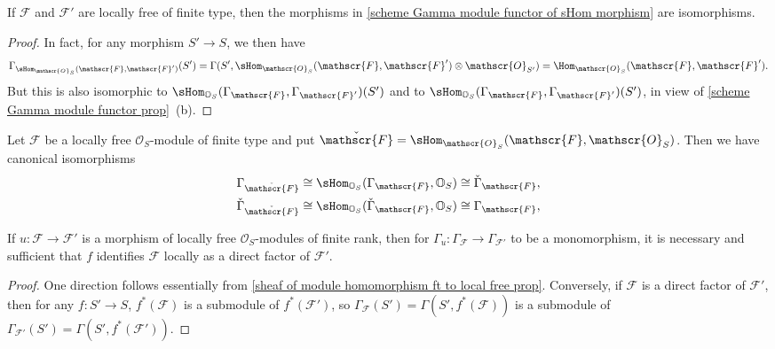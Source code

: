 \begin{proposition}\label{scheme Gamma module functor of sHom locally free prop}
If $\mathscr{F}$ and $\mathscr{F}'$ are locally free of finite type, then the morphisms in \cref{scheme Gamma module functor of sHom morphism} are isomorphisms.
\end{proposition}
\begin{proof}
In fact, for any morphism $S'\to S$, we then have
\[\Gamma_{\sHom_{\mathscr{O}_S}(\mathscr{F},\mathscr{F}')}(S')=\Gamma(S',\sHom_{\mathscr{O}_S}(\mathscr{F},\mathscr{F}')\otimes\mathscr{O}_{S'})=\Hom_{\mathscr{O}_S}(\mathscr{F},\mathscr{F}').\]
But this is also isomorphic to $\sHom_{\mathbb{O}_S}(\Gamma_\mathscr{F},\Gamma_{\mathscr{F}'})(S')$ and to $\sHom_{\mathbb{O}_S}(\Gamma_\mathscr{F},\Gamma_{\mathscr{F}'})(S')$, in view of \cref{scheme Gamma module functor prop}~(b).
\end{proof}

\begin{corollary}\label{scheme Gamma module functor isomorphic if locally free}
Let $\mathscr{F}$ be a locally free $\mathscr{O}_S$-module of finite type and put $\check{\mathscr{F}}=\sHom_{\mathscr{O}_S}(\mathscr{F},\mathscr{O}_S)$. Then we have canonical isomorphisms
\begin{align*}
\Gamma_{\check{\mathscr{F}}}&\cong\sHom_{\mathbb{O}_S}(\Gamma_\mathscr{F},\mathbb{O}_S)\cong\check{\Gamma}_\mathscr{F},\\
\check{\Gamma}_{\check{\mathscr{F}}}&\cong\sHom_{\mathbb{O}_S}(\check{\Gamma}_\mathscr{F},\mathbb{O}_S)\cong\Gamma_\mathscr{F},
\end{align*}
\end{corollary}

\begin{proposition}\label{scheme Gamma module functor monomorphism iff split}
If $u:\mathscr{F}\to\mathscr{F}'$ is a morphism of locally free $\mathscr{O}_S$-modules of finite rank, then for $\Gamma_u:\Gamma_\mathscr{F}\to\Gamma_{\mathscr{F}'}$ to be a monomorphism, it is necessary and sufficient that $f$ identifies $\mathscr{F}$ locally as a direct factor of $\mathscr{F}'$.
\end{proposition}
\begin{proof}
One direction follows essentially from \cref{sheaf of module homomorphism ft to local free prop}. Conversely, if $\mathscr{F}$ is a direct factor of $\mathscr{F}'$, then for any $f:S'\to S$, $f^*(\mathscr{F})$ is a submodule of $f^*(\mathscr{F}')$, so $\Gamma_\mathscr{F}(S')=\Gamma(S',f^*(\mathscr{F}))$ is a submodule of $\Gamma_{\mathscr{F}'}(S')=\Gamma(S',f^*(\mathscr{F}'))$.
\end{proof}

